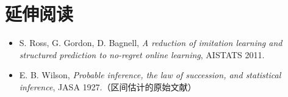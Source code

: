 \section*{延伸阅读}
\begin{itemize}[leftmargin=2em,itemsep=2pt]
  \item S. Ross, G. Gordon, D. Bagnell, \emph{A reduction of imitation learning and structured
        prediction to no-regret online learning}, AISTATS 2011.
  \item E. B. Wilson, \emph{Probable inference, the law of succession, and statistical inference},
        JASA 1927.（区间估计的原始文献）
\end{itemize}
